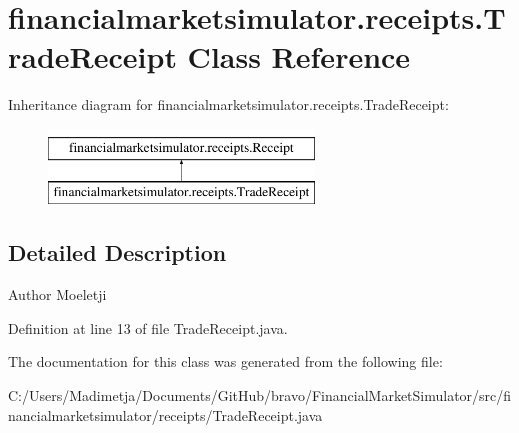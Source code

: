 \hypertarget{classfinancialmarketsimulator_1_1receipts_1_1_trade_receipt}{\section{financialmarketsimulator.\+receipts.\+Trade\+Receipt Class Reference}
\label{classfinancialmarketsimulator_1_1receipts_1_1_trade_receipt}
}
Inheritance diagram for financialmarketsimulator.\+receipts.\+Trade\+Receipt\+:\begin{figure}[H]
\begin{center}
\leavevmode
\includegraphics[height=2.000000cm]{classfinancialmarketsimulator_1_1receipts_1_1_trade_receipt}
\end{center}
\end{figure}


\subsection{Detailed Description}
\begin{DoxyAuthor}{Author}
Moeletji 
\end{DoxyAuthor}


Definition at line 13 of file Trade\+Receipt.\+java.



The documentation for this class was generated from the following file\+:\begin{DoxyCompactItemize}
\item 
C\+:/\+Users/\+Madimetja/\+Documents/\+Git\+Hub/bravo/\+Financial\+Market\+Simulator/src/financialmarketsimulator/receipts/Trade\+Receipt.\+java\end{DoxyCompactItemize}
